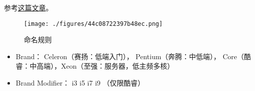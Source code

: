 
\begin{issues}
\issueDraft
\end{issues}

参考\href{https://www.itechtics.com/processor-generations/}{这篇文章}。

\begin{figure}[ht]
\centering
\texttt{[image: ./figures/44c08722397b48ec.png]}
\caption{命名规则} \label{fig_IntelC_1}
\end{figure}

\begin{itemize}
\item Brand： Celeron（赛扬：低端入门）， Pentium（奔腾：中低端）， Core（酷睿：中高端），Xeon（至强：服务器，低主频多核）
\item Brand Modifier： i3 i5 i7 i9 （仅限酷睿）
\end{itemize}
